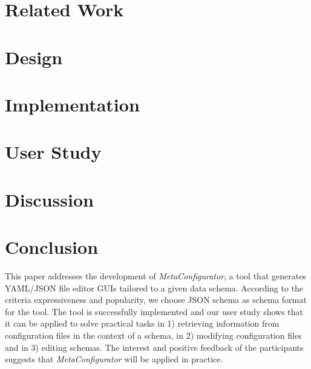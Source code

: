 \documentclass[lettersize,journal]{IEEEtran}
\newcommand{\cfgfiles}{configuration files}
\newcommand{\toolname}{\textit{MetaConfigurator}} %
\begin{document}
 \section{Related Work}\label{sec:research}
 


 \section{Design}\label{sec:design}
 


 \section{Implementation}\label{sec:implementation}
 

 \section{User Study}\label{sec:user_study}
 


 \section{Discussion}\label{sec:discussion} %

 


 \section{Conclusion}\label{sec:conclusion} %

 This paper addresses the development of \toolname{}, a tool that generates YAML/JSON file editor GUIs tailored to a given data schema.
According to the criteria expressiveness and popularity, we choose JSON schema as schema format for the tool.
The tool is successfully implemented and our user study shows that it can be applied to solve practical tasks in 1) retrieving information from \cfgfiles{} in the context of a schema, in 2) modifying \cfgfiles{} and in 3) editing schemas.
The interest and positive feedback of the participants suggests that \toolname{} will be applied in practice.

\end{document}
